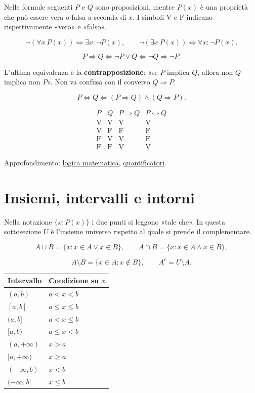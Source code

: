 Nelle formule seguenti \(P\) e \(Q\) sono proposizioni, mentre \(P(x)\) è una proprietà che può essere vera o falsa a seconda di \(x\). I simboli \(\mathrm V\) e \(\mathrm F\) indicano rispettivamente «vero» e «falso».

\[
\neg(\forall x\ P(x))\Longleftrightarrow\exists x:\neg P(x),
\qquad
\neg(\exists x\ P(x))\Longleftrightarrow\forall x:\neg P(x).
\]

\[
P\Rightarrow Q
\Longleftrightarrow
\neg P\lor Q
\Longleftrightarrow
\neg Q\Rightarrow\neg P.
\]

L'ultima equivalenza è la \textbf{contrapposizione}: «se \(P\) implica \(Q\), allora non \(Q\) implica non \(P\)». Non va confusa con il converso \(Q\Rightarrow P\).

\[
P\Longleftrightarrow Q
\Longleftrightarrow
(P\Rightarrow Q)\land(Q\Rightarrow P).
\]

\[
\begin{array}{c|c|c|c}
P&Q&P\Rightarrow Q&P\Longleftrightarrow Q\\
\hline
\mathrm V&\mathrm V&\mathrm V&\mathrm V\\
\mathrm V&\mathrm F&\mathrm F&\mathrm F\\
\mathrm F&\mathrm V&\mathrm V&\mathrm F\\
\mathrm F&\mathrm F&\mathrm V&\mathrm V
\end{array}
\]

Approfondimento: \href{https://ingegnerismo.it/matematica/logica-matematica/}{logica matematica}, \href{https://ingegnerismo.it/matematica/quantificatori/}{quantificatori}.

\section{Insiemi, intervalli e intorni}\label{insiemi-intervalli-e-intorni}

Nella notazione \(\{x:P(x)\}\) i due punti si leggono «tale che». In questa sottosezione \(U\) è l'insieme universo rispetto al quale si prende il complementare.

\[
A\cup B=\{x:x\in A\lor x\in B\},
\qquad
A\cap B=\{x:x\in A\land x\in B\},
\]

\[
A\setminus B=\{x\in A:x\notin B\},
\qquad
A^c=U\setminus A.
\]

\begin{longtable}[]{@{}ll@{}}
\toprule\noalign{}
Intervallo & Condizione su \(x\) \\
\midrule\noalign{}
\endhead
\bottomrule\noalign{}
\endlastfoot
\((a,b)\) & \(a<x<b\) \\
\([a,b]\) & \(a\le x\le b\) \\
\((a,b]\) & \(a<x\le b\) \\
\([a,b)\) & \(a\le x<b\) \\
\((a,+\infty)\) & \(x>a\) \\
\([a,+\infty)\) & \(x\ge a\) \\
\((-\infty,b)\) & \(x<b\) \\
\((-\infty,b]\) & \(x\le b\) \\
\end{longtable}

